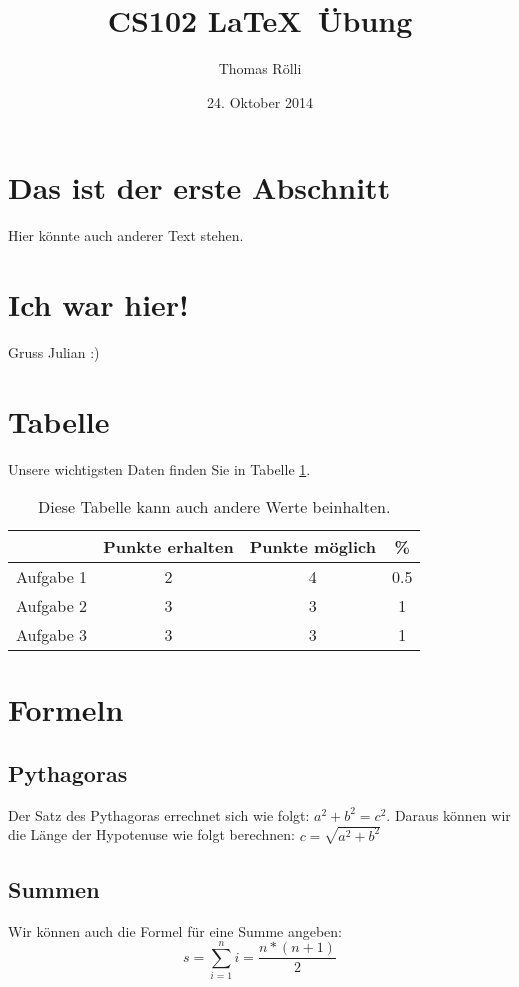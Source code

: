 \documentclass[11pt,a4paper]{article}
\date{24. Oktober 2014}
\author{Thomas Rölli}
\title{CS102 \LaTeX\ Übung}
\begin{document}
\maketitle

\section{Das ist der erste Abschnitt}
Hier könnte auch anderer Text stehen.
\section{Ich war hier!}
Gruss Julian :)
\section{Tabelle}
Unsere wichtigsten Daten finden Sie in Tabelle \ref{tab1}.
\begin{table}[h]
\centering
\begin{tabular}{c|c|c|c}
& Punkte erhalten & Punkte möglich & \% \\
\hline
Aufgabe 1 & 2 & 4 & 0.5 \\
Aufgabe 2 & 3 & 3 & 1 \\
Aufgabe 3 & 3 & 3 & 1 \\
\end{tabular}
\caption{Diese Tabelle kann auch andere Werte beinhalten.}
\label{tab1}
\end{table}
\section{Formeln}
\subsection{Pythagoras}
Der Satz des Pythagoras errechnet sich wie folgt: $a^2+b^2=c^2$. Daraus können wir die Länge der Hypotenuse wie folgt berechnen: $c=\sqrt{a^2+b^2}$
\subsection{Summen}
Wir können auch die Formel für eine Summe angeben:
\begin{equation}
s=\sum_{i=1}^{n}i=\frac{n*(n+1)}{2}
\end{equation}
\end{document}
